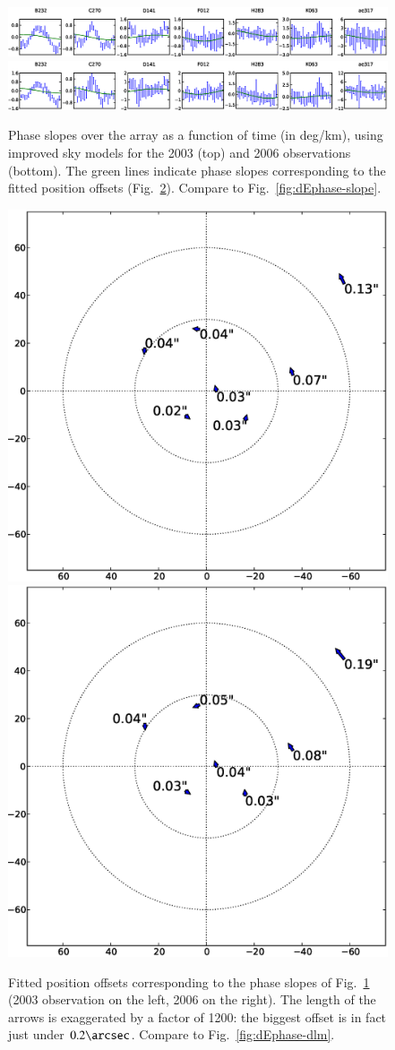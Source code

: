\documentclass[]{aa}
\begin{document}
\begin{figure}
\centering
\includegraphics[width=\columnwidth]{o2003new_dEphase_array_slopes}\\
\includegraphics[width=\columnwidth]{o2006new_dEphase_array_slopes}
\caption{\label{fig:new-dEphase-slope}Phase slopes over the array as a function of time (in deg/km), using improved sky models for the 2003 (top) and 2006 observations (bottom). The green lines indicate phase slopes corresponding to the fitted position offsets (Fig.~\ref{fig:new-dEphase-dlm}). Compare to Fig.~\ref{fig:dEphase-slope}.}
\end{figure}

\begin{figure}
\centering
\includegraphics[width=.5\columnwidth]{o2003new_dE_lm_offsets}%
\includegraphics[width=.5\columnwidth]{o2006new_dE_lm_offsets}
\caption{\label{fig:new-dEphase-dlm}Fitted position offsets corresponding to the phase slopes of Fig.~\ref{fig:new-dEphase-slope} (2003 observation on the left, 2006 on the right). The length of the arrows is exaggerated by a factor of 1200: the biggest offset is in fact just under $0.2\arcsec$. Compare to Fig.~\ref{fig:dEphase-dlm}.}
\end{figure}
\end{document}
